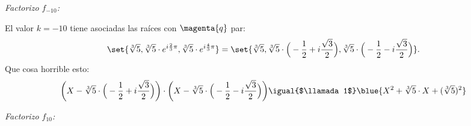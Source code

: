 \bigskip

\textit{Factorizo $f_{\scriptscriptstyle -10}$:}\par

El valor $k = -10$ tiene asociadas las raíces con $\magenta{q}$ par:
$$
  \set{\sqrt[3]{5}, \sqrt[3]{5} \cdot e^{i\frac{2}{3}\pi}, \sqrt[3]{5} \cdot e^{i\frac{4}{3}\pi} } =
  \set{\sqrt[3]{5}, \sqrt[3]{5} \cdot \Big(- \frac{1}{2} + i\frac{\sqrt{3}}{2} \Big), \sqrt[3]{5} \cdot \Big(- \frac{1}{2} - i\frac{\sqrt{3}}{2} \Big) }.
$$
Que cosa horrible esto:
$$
  \bigg(X - \sqrt[3]{5} \cdot \Big(- \frac{1}{2} + i\frac{\sqrt{3}}{2}\Big)\bigg)
  \cdot
  \bigg(X - \sqrt[3]{5} \cdot \Big(- \frac{1}{2} - i\frac{\sqrt{3}}{2}\Big)\bigg)
  \igual{$\llamada1$}
  \blue{X^2  + \sqrt[3]{5} \cdot X + (\sqrt[3]{5})^2}
$$

\begin{center}
\end{center}

\bigskip

\textit{Factorizo $f_{\scriptscriptstyle 10}$:}

